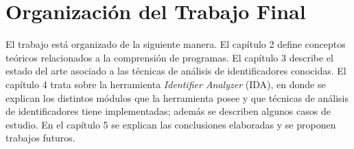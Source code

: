 \section{Organización del Trabajo Final}

El trabajo está organizado de la siguiente manera. El capítulo 2 define conceptos teóricos relacionados a la comprensión de programas. El capítulo 3 describe el estado del arte asociado a las técnicas de análisis de identificadores conocidas. El capítulo 4 trata sobre la herramienta \textit{Identifier Analyzer} (IDA), en donde se explican los distintos módulos que la herramienta posee y que técnicas de análisis de identificadores tiene implementadas; además se describen algunos casos de estudio.
En el capítulo 5 se explican las conclusiones elaboradas y se proponen trabajos futuros.